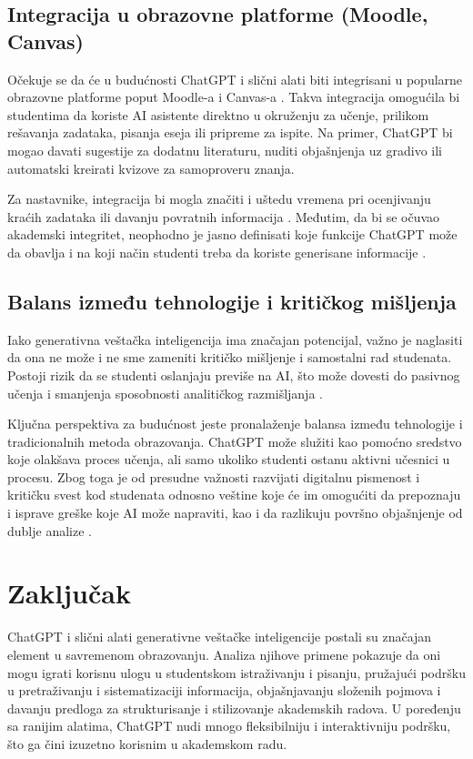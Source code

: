 \documentclass[12pt]{article}
\begin{document}
\subsection{Integracija u obrazovne platforme (Moodle, Canvas)}

Očekuje se da će u budućnosti ChatGPT i slični alati biti integrisani u popularne obrazovne platforme poput Moodle-a i Canvas-a \cite{huang2024information}. Takva integracija omogućila bi studentima da koriste AI asistente direktno u okruženju za učenje, prilikom rešavanja zadataka, pisanja eseja ili pripreme za ispite. Na primer, ChatGPT bi mogao davati sugestije za dodatnu literaturu, nuditi objašnjenja uz gradivo ili automatski kreirati kvizove za samoproveru znanja.

Za nastavnike, integracija bi mogla značiti i uštedu vremena pri ocenjivanju kraćih zadataka ili davanju povratnih informacija \cite{shyr2024summarization}. Međutim, da bi se očuvao akademski integritet, neophodno je jasno definisati koje funkcije ChatGPT može da obavlja i na koji način studenti treba da koriste generisane informacije \cite{montenegro2023impact}.

\subsection{Balans između tehnologije i kritičkog mišljenja}

Iako generativna veštačka inteligencija ima značajan potencijal, važno je naglasiti da ona ne može i ne sme zameniti kritičko mišljenje i samostalni rad studenata. Postoji rizik da se studenti oslanjaju previše na AI, što može dovesti do pasivnog učenja i smanjenja sposobnosti analitičkog razmišljanja \cite{edwards2023chatgpt}.

Ključna perspektiva za budućnost jeste pronalaženje balansa između tehnologije i tradicionalnih metoda obrazovanja. ChatGPT može služiti kao pomoćno sredstvo koje olakšava proces učenja, ali samo ukoliko studenti ostanu aktivni učesnici u procesu. Zbog toga je od presudne važnosti razvijati digitalnu pismenost i kritičku svest kod studenata odnosno veštine koje će im omogućiti da prepoznaju i isprave greške koje AI može napraviti, kao i da razlikuju površno objašnjenje od dublje analize \cite{baig2024systematic}.

\section{Zaključak} 
ChatGPT i slični alati generativne veštačke inteligencije postali su značajan element u savremenom obrazovanju. Analiza njihove primene pokazuje da oni mogu igrati korisnu ulogu u studentskom istraživanju i pisanju, pružajući podršku u pretraživanju i sistematizaciji informacija, objašnjavanju složenih pojmova i davanju predloga za strukturisanje i stilizovanje akademskih radova. U poređenju sa ranijim alatima, ChatGPT nudi mnogo fleksibilniju i interaktivniju podršku, što ga čini izuzetno korisnim u akademskom radu.
\end{document}
